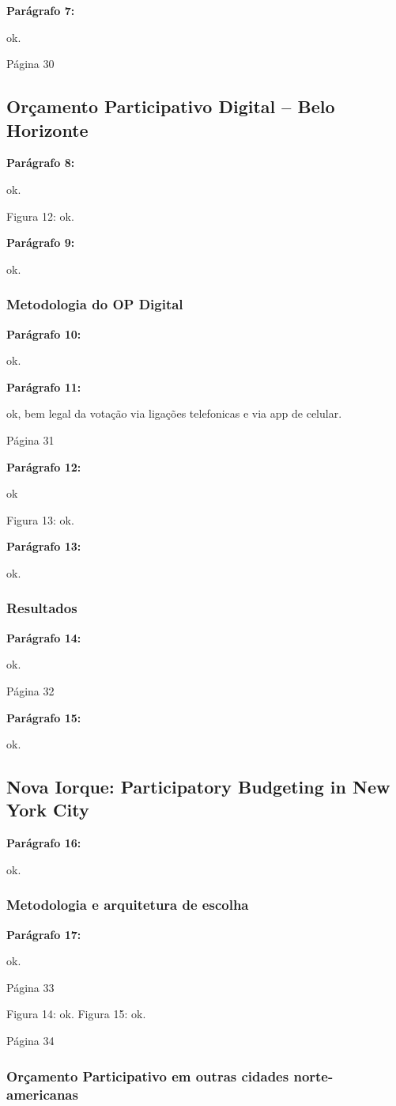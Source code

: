 \documentclass[12pt]{report}
\newcommand{\pp}[1]{

\textbf{Parágrafo #1:}

}
\begin{document}
\pp{7} ok.

\noindent Página 30

\subsection{Orçamento Participativo Digital – Belo Horizonte}

\pp{8} ok.

Figura 12: ok.

\pp{9} ok.

\subsubsection{Metodologia do OP Digital}

\pp{10} ok.

\pp{11} ok, bem legal da votação via ligações telefonicas e via app de celular.

\noindent Página 31

\pp{12} ok

Figura 13: ok.

\pp{13} ok.

\subsubsection{Resultados}

\pp{14} ok.

\noindent Página 32

\pp{15} ok.

\subsection{Nova Iorque: Participatory Budgeting in New York City}

\pp{16} ok.

\subsubsection{Metodologia e arquitetura de escolha}

\pp{17} ok.

\noindent Página 33

Figura 14: ok.
Figura 15: ok.

\noindent Página 34

\subsubsection{Orçamento Participativo em outras cidades norte-americanas}
\end{document}
